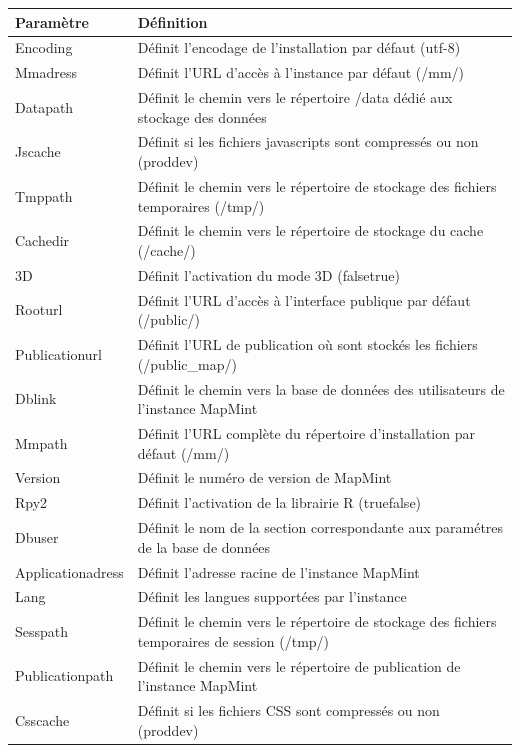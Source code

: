 \documentclass[letterpaper,10pt,french]{sphinxmanual}
\begin{document}
\begin{tabulary}{\linewidth}{|L|L|}
\hline

\textbf{Paramètre}
 & 
\textbf{Définition}
\\
\hline
Encoding
 & 
Définit l'encodage de l'installation par défaut (utf-8)
\\
\hline
Mmadress
 & 
Définit l'URL d'accès à l'instance par défaut (/mm/)
\\
\hline
Datapath
 & 
Définit le chemin vers le répertoire /data dédié aux stockage des données
\\
\hline
Jscache
 & 
Définit si les fichiers javascripts sont compressés ou non (prod\textbar{}dev)
\\
\hline
Tmppath
 & 
Définit le chemin vers le répertoire de stockage des fichiers temporaires (/tmp/)
\\
\hline
Cachedir
 & 
Définit le chemin vers le répertoire de stockage du cache (/cache/)
\\
\hline
3D
 & 
Définit l'activation du mode 3D (false\textbar{}true)
\\
\hline
Rooturl
 & 
Définit l'URL d'accès à l'interface publique par défaut (/public/)
\\
\hline
Publicationurl
 & 
Définit l'URL de publication où sont stockés les fichiers (/public\_map/)
\\
\hline
Dblink
 & 
Définit le chemin vers la base de données des utilisateurs de l'instance MapMint
\\
\hline
Mmpath
 & 
Définit l'URL complète du répertoire d'installation par défaut (/mm/)
\\
\hline
Version
 & 
Définit le numéro de version de MapMint
\\
\hline
Rpy2
 & 
Définit l'activation de la librairie R (true\textbar{}false)
\\
\hline
Dbuser
 & 
Définit le nom de la section correspondante aux paramétres de la base de données
\\
\hline
Applicationadress
 & 
Définit l'adresse racine de l'instance MapMint
\\
\hline
Lang
 & 
Définit les langues supportées par l'instance
\\
\hline
Sesspath
 & 
Définit le chemin vers le répertoire de stockage des fichiers temporaires de session (/tmp/)
\\
\hline
Publicationpath
 & 
Définit le chemin vers le répertoire de publication de l'instance MapMint
\\
\hline
Csscache
 & 
Définit si les fichiers CSS sont compressés ou non (prod\textbar{}dev)

\end{tabulary}
\end{document}
